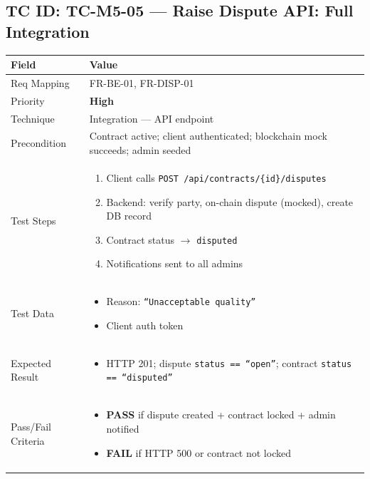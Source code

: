 \documentclass[12pt,a4paper]{article}
\newcommand{\sevhigh}{\textcolor{severityhigh}{\textbf{High}}}
\newcommand{\passresult}{\textcolor{passgreen}{\textbf{PASS}}}
\newcommand{\failresult}{\textcolor{failred}{\textbf{FAIL}}}
\begin{document}
\vspace{0.8cm}

\subsection{TC ID: TC-M5-05 --- Raise Dispute API: Full Integration}

\begin{tabular}{|p{}|p{}|}
\hline
\rowcolor{lightblue} \textbf{Field} & \textbf{Value} \\
\hline
Req Mapping & FR-BE-01, FR-DISP-01 \\
\hline
Priority & \sevhigh \\
\hline
Technique & Integration --- API endpoint \\
\hline
Precondition & Contract active; client authenticated; blockchain mock succeeds; admin seeded \\
\hline
Test Steps &
\begin{enumerate}[nosep, leftmargin=*]
  \item Client calls \texttt{POST /api/contracts/\{id\}/disputes}
  \item Backend: verify party, on-chain dispute (mocked), create DB record
  \item Contract status $\rightarrow$ \texttt{disputed}
  \item Notifications sent to all admins
\end{enumerate} \\
\hline
Test Data &
\begin{itemize}[nosep, leftmargin=*]
  \item Reason: \texttt{``Unacceptable quality''}
  \item Client auth token
\end{itemize} \\
\hline
Expected Result &
\begin{itemize}[nosep, leftmargin=*]
  \item HTTP 201; dispute \texttt{status == ``open''}; contract \texttt{status == ``disputed''}
\end{itemize} \\
\hline
Pass/Fail Criteria &
\begin{itemize}[nosep, leftmargin=*]
  \item \passresult{} if dispute created + contract locked + admin notified
  \item \failresult{} if HTTP 500 or contract not locked
\end{itemize} \\
\hline
\end{tabular}
\end{document}
